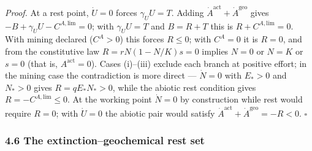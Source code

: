 \documentclass[11pt]{article}
\begin{document}
\emph{Proof.} At a rest point, \(\dot U = 0\) forces \(\gamma_U U = T\).
Adding \(\dot A^{\mathrm{act}} + \dot A^{\mathrm{geo}}\) gives
\(-B + \gamma_U U - C^{A,\mathrm{lim}} = 0\); with \(\gamma_U U = T\)
and \(B = R + T\) this is \(R + C^{A,\mathrm{lim}} = 0\). With mining
declared (\(C^A > 0\)) this forces \(R \le 0\); with \(C^A = 0\) it is
\(R = 0\), and from the constitutive law \(R = rN(1 - N/K)s = 0\)
implies \(N = 0\) or \(N = K\) or \(s = 0\) (that is,
\(A^{\mathrm{act}} = 0\)). Cases (i)--(iii) exclude each branch at
positive effort; in the mining case the contradiction is more direct ---
\(\dot N = 0\) with \(E_* > 0\) and \(N_* > 0\) gives
\(R = qE_*N_* > 0\), while the abiotic rest condition gives
\(R = -C^{A,\mathrm{lim}} \le 0\). At the working point \(\dot N = 0\)
by construction while rest would require \(R = 0\); with \(\dot U = 0\)
the abiotic pair would satisfy
\(\dot A^{\mathrm{act}} + \dot A^{\mathrm{geo}} = -R < 0\). \ensuremath{\square}

\subsubsection{4.6 The extinction--geochemical rest
set}\label{the-extinctiongeochemical-rest-set}
\end{document}
